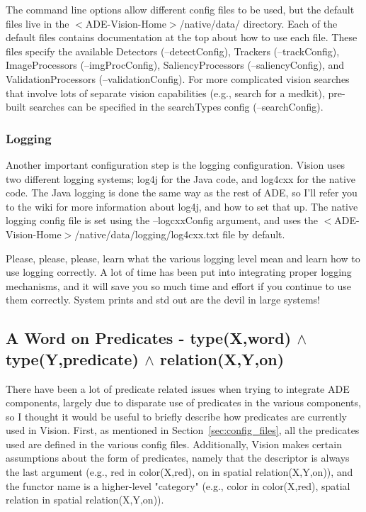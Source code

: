 \documentclass{article}
\begin{document}
The command line options allow different config files to be used, but the default
files live in the $<$ADE-Vision-Home$>$/native/data/ directory. Each of the default files
contains documentation at the top about how to use each file. These files specify
the available Detectors (--detectConfig), Trackers (--trackConfig), ImageProcessors
(--imgProcConfig), SaliencyProcessors (--saliencyConfig), and ValidationProcessors
(--validationConfig). For more complicated vision searches that involve
lots of separate vision capabilities (e.g., search for a medkit), pre-built searches
can be specified in the searchTypes config (--searchConfig).

\subsubsection{Logging}
Another important configuration step is the logging configuration. Vision uses two different
logging systems; log4j for the Java code, and log4cxx for the native code. The Java logging
is done the same way as the rest of ADE, so I'll refer you to the wiki for more information
about log4j, and how to set that up. The native logging config file is set using the
--logcxxConfig argument, and uses the $<$ADE-Vision-Home$>$/native/data/logging/log4cxx.txt
file by default.

Please, please, please, learn what the various logging level mean and learn how to use
logging correctly. A lot of time has been put into integrating proper logging mechanisms,
and it will save you so much time and effort if you continue to use them correctly. System
prints and std out are the devil in large systems!

\subsection{A Word on Predicates - type(X,word) $\wedge$ type(Y,predicate) $\wedge$ relation(X,Y,on)}
\label{sec:predicates}
There have been a lot of predicate related issues when trying to integrate ADE
components, largely due to disparate use of predicates in the various components,
so I thought it would be useful to briefly describe how predicates are currently
used in Vision. First, as mentioned in Section~\ref{sec:config_files}, all the predicates
used are defined in the various config files. Additionally, Vision makes certain
assumptions about the form of predicates, namely that the descriptor is always the
last argument (e.g., red in color(X,red), on in spatial relation(X,Y,on)), and
the functor name is a higher-level "category" (e.g., color in color(X,red), spatial relation
in spatial relation(X,Y,on)). 
\end{document}
